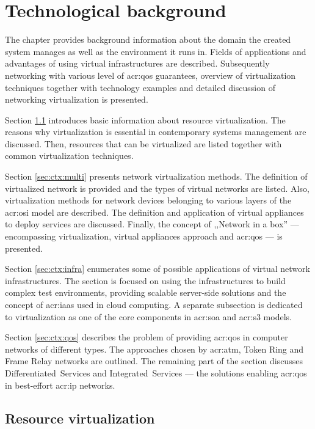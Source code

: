 \documentclass[11pt,openany]{book}
\begin{document}
  \chapter{Technological background}
  \label{chap:bck}

    The chapter provides background information about the domain the created system manages as well as the environment
    it runs in. Fields of applications and advantages of using virtual infrastructures are described. Subsequently
    networking with various level of \gls{acr:qos} guarantees, overview of virtualization techniques together with
    technology examples and detailed discussion of networking virtualization is presented.

    Section \ref{sec:ctx:virt} introduces basic information about resource virtualization. The reasons why
    virtualization is essential in contemporary systems management are discussed. Then, resources that can be
    virtualized are listed together with common virtualization techniques.

    Section \ref{sec:ctx:multi} presents network virtualization methods. The definition of virtualized network is
    provided and the types of virtual networks are listed. Also, virtualization methods for network devices belonging to
    various layers of the \gls{acr:osi} model are described. The definition and application of virtual appliances to
    deploy services are discussed. Finally, the concept of ,,Network in a box'' --- encompassing virtualization, virtual
    appliances approach and \gls{acr:qos} --- is presented.

    Section \ref{sec:ctx:infra} enumerates some of possible applications of virtual network infrastructures. The section
    is focused on using the infrastructures to build complex test environments, providing scalable server-side solutions
    and the concept of \gls{acr:iaas} used in cloud computing. A separate subsection is dedicated to virtualization as
    one of the core components in \gls{acr:soa} and \gls{acr:s3} models.

    Section \ref{sec:ctx:qos} describes the problem of providing \gls{acr:qos} in computer networks of different types.
    The approaches chosen by \gls{acr:atm}, Token Ring and Frame Relay networks are outlined. The remaining part of the
    section discusses Differentiated~Services and Integrated~Services --- the solutions enabling \gls{acr:qos} in
    best-effort \gls{acr:ip} networks.


    \section{Resource virtualization}
    \label{sec:ctx:virt}
\end{document}

